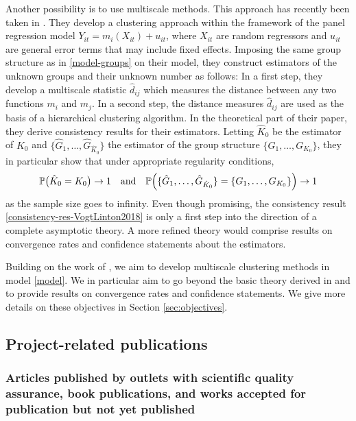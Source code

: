 \documentclass[a4paper,12pt]{article}
\begin{document}
Another possibility is to use multiscale methods. This approach has recently been taken in \cite{VogtLinton2018}. They develop a clustering approach within the framework of the panel regression model $Y_{it} = m_i(X_{it}) + u_{it}$, where $X_{it}$ are random regressors and $u_{it}$ are general error terms that may include fixed effects. Imposing the same group structure as in \eqref{model-groups} on their  model, they construct estimators of the unknown groups and their unknown number as follows: In a first step, they develop a multiscale statistic $\hat{d}_{ij}$ which measures the distance between any two functions $m_i$ and $m_j$. In a second step, the distance measures $\hat{d}_{ij}$ are used as the basis of a hierarchical clustering algorithm. In the theoretical part of their paper, they derive consistency results for their estimators. Letting $\hat{K}_0$ be the estimator of $K_0$ and $\{ \hat{G}_1,\ldots,\hat{G}_{\hat{K}_0} \}$ the estimator of the group structure $\{ G_1,\ldots,G_{K_0} \}$, they in particular show that under appropriate regularity conditions, 
\begin{equation}\label{consistency-res-VogtLinton2018}
\mathbb{P} \big( \hat{K}_0 = K_0 \big) \rightarrow 1 \quad \text{and} \quad \mathbb{P} \Big( \{ \hat{G}_1,\ldots,\hat{G}_{\hat{K}_0} \} = \{ G_1,\ldots,G_{K_0} \} \Big) \rightarrow 1 
\end{equation}
as the sample size goes to infinity. %
Even though promising, the consistency result \eqref{consistency-res-VogtLinton2018} is only a first step into the direction of a complete asymptotic theory. A more refined theory would comprise results on convergence rates and confidence statements about the estimators. 


Building on the work of \cite{VogtLinton2018}, we aim to develop multiscale clustering methods in model \eqref{model}. We in particular aim to go beyond the basic theory derived in \cite{VogtLinton2018} and to provide results on convergence rates and confidence statements. We give more details on these objectives in Section \ref{sec:objectives}.  


\subsection{Project-related publications}


\subsubsection{Articles published by outlets with scientific quality assurance, book publications, and works accepted for publication but not yet published}
\end{document}
